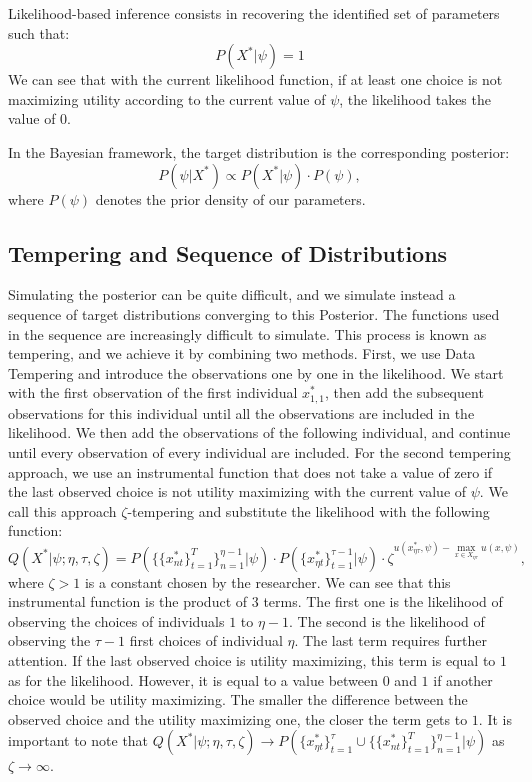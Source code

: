 \documentclass[12pt]{article}
\begin{document}
Likelihood-based inference consists in recovering the identified set of parameters such that: $$P(X^*|\psi) = 1 $$
We can see that with the current likelihood function, if at least one choice is not maximizing utility according to the current value of $\psi$, the likelihood takes the value of $0$.

In the Bayesian framework, the target distribution is the corresponding posterior:
$$  P(\psi|X^*) \propto P(X^*|\psi) \cdot P(\psi),$$
where $P(\psi)$ denotes the prior density of our parameters.

\subsection{Tempering and Sequence of Distributions} 

Simulating the posterior can be quite difficult, and we simulate instead a sequence of target distributions converging to this Posterior. The functions used in the sequence are increasingly difficult to simulate. This process is known as tempering, and we achieve it by combining two methods. First, we use Data Tempering and introduce the observations one by one in the likelihood. We start with the first observation of the first individual $x_{1,1}^*$, then add the subsequent observations for this individual until all the observations are included in the likelihood. We then add the observations of the following individual, and continue until every observation of every individual are included. For the second tempering approach, we use an instrumental function that does not take a value of zero if the last observed choice is not utility maximizing with the current value of $\psi$. We call this approach $\zeta$-tempering and substitute the likelihood with the following function:  
$$Q(X^*|\psi;\eta,\tau,\zeta) = P(\{\{x_{nt}^*\}_{t=1}^T\}_{n=1}^{\eta-1}|\psi) \cdot  P(\{x_{\eta t}^*\}_{t=1}^{\tau-1}|\psi) \cdot \zeta^{ u(x_{\eta \tau}^*,\psi) - \max_{x \in X_{\eta \tau}} u(x,\psi)},$$
where $\zeta>1$ is a constant chosen by the researcher. We can see that this instrumental function is the product of $3$ terms. The first one is the likelihood of observing the choices of individuals $1$ to $\eta-1$. The second is the likelihood of observing the $\tau-1$ first choices of individual $\eta$. The last term requires further attention. If the last observed choice is utility maximizing, this term is equal to $1$ as for the likelihood. However, it is equal to a value between $0$ and $1$ if another choice would be utility maximizing. The smaller the difference between the observed choice and the utility maximizing one, the closer the term gets to $1$. It is important to note that $Q(X^*|\psi;\eta,\tau,\zeta) \to P(\{x_{\eta t}^*\}_{t=1}^\tau \cup \{\{x_{nt}^*\}_{t=1}^T\}_{n=1}^{\eta-1}|\psi)$ as $\zeta \to \infty$. 
\end{document}
